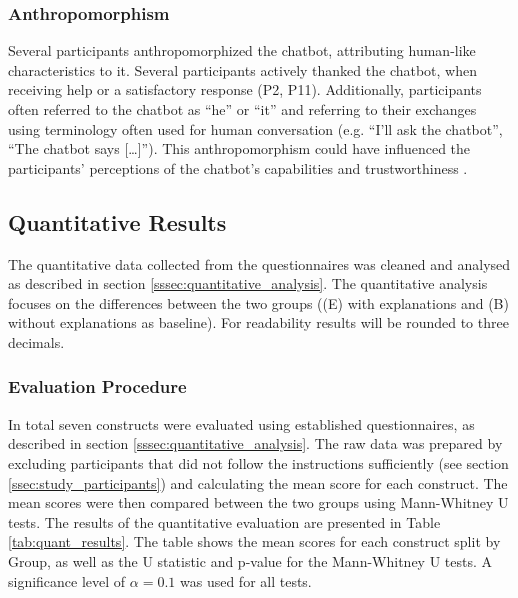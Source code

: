 \subsubsection{Anthropomorphism} \label{sssec:anthropomorphism}

Several participants anthropomorphized the chatbot, attributing human-like characteristics to it. Several participants actively thanked the chatbot, when receiving help or a satisfactory response (P2, P11). Additionally, participants often referred to the chatbot as “he” or “it” and referring to their exchanges using terminology often used for human conversation (e.g. “I'll ask the chatbot”, “The chatbot says [\dots]”). This anthropomorphism could have influenced the participants' perceptions of the chatbot's capabilities and trustworthiness \parencite{Li2022}.

\subsection{Quantitative Results} \label{ssec:quant_results}

The quantitative data collected from the questionnaires was cleaned and analysed as described in section \ref{sssec:quantitative_analysis}. The quantitative analysis focuses on the differences between the two groups ((E) with explanations and (B) without explanations as baseline).
For readability results will be rounded to three decimals.

\subsubsection{Evaluation Procedure} \label{sssec:eval_procedure}


In total seven constructs were evaluated using established questionnaires, as described in section \ref{sssec:quantitative_analysis}. The raw data was prepared by excluding participants that did not follow the instructions sufficiently (see section \ref{ssec:study_participants}) and calculating the mean score for each construct. The mean scores were then compared between the two groups using Mann-Whitney U tests. The results of the quantitative evaluation are presented in Table \ref{tab:quant_results}. The table shows the mean scores for each construct split by Group, as well as the U statistic and p-value for the Mann-Whitney U tests. A significance level of $\alpha = 0.1$ was used for all tests.

